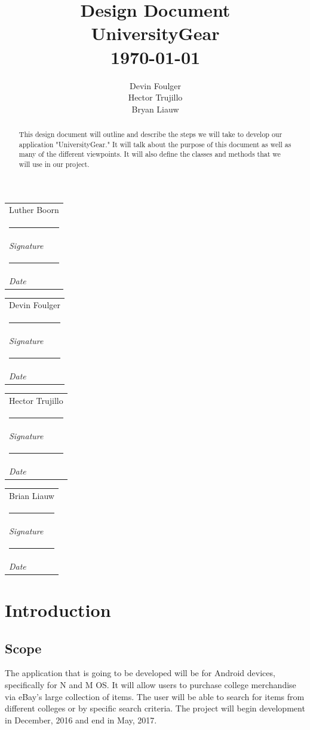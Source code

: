\documentclass[journal,compsoc, 10pt, draftclsnofoot, onecolumn]{IEEEtran}
\makeatletter
\newcommand{\namesigdate}[2][6cm]{%
  \begin{tabular}{@{}p{#1}@{}}
    #2 \\[0.5\normalbaselineskip] \hrule \\[0.pt]
    {\small \vspace{-3em} \textit{Signature}} \\[0.5\normalbaselineskip] \hrule \\[0pt]
    {\small \vspace{-3em}\textit{Date}}
  \end{tabular}
}
\makeatother
\begin{document}
\title{\vspace{20em}Design Document \\{\vspace{-1ex}\huge UniversityGear} \\
{\large \today}}
\author{\vspace{10ex}Devin Foulger \\{\vspace{-1ex}Hector Trujillo}
\\{\vspace{-1ex}Bryan Liauw}}

\begin{titlepage}

\maketitle
\thispagestyle{empty}

\begin{abstract}
This design document will outline and describe the steps we will take to develop 
our application "UniversityGear."  It will talk about the purpose of this 
document as well as many of the different viewpoints. It will also define 
the classes and methods that we will use in our project. 
\end{abstract}

\vspace{2ex}\noindent 
\namesigdate{Luther Boorn} \hfill
\namesigdate{Devin Foulger} \hfill

\vspace{4ex}\noindent
\namesigdate{Hector Trujillo} \hfill
\namesigdate{Brian Liauw} \hfill

\end{titlepage}

\tableofcontents


\section{Introduction}
\subsection{Scope}
The application that is going to be developed will be for Android devices, 
specifically for N and M OS. It will allow users to purchase college merchandise
 via eBay's large collection of items. The user will be able to search for items
 from different colleges or by specific search criteria. The project will begin 
development in December, 2016 and end in May, 2017.
\end{document}

